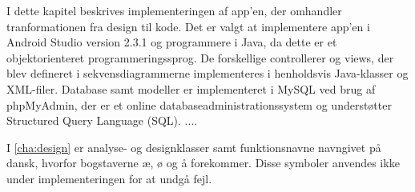 I dette kapitel beskrives implementeringen af app'en, der omhandler tranformationen fra design til kode. Det er valgt at implementere app'en i Android Studio version 2.3.1 og programmere i Java, da dette er et objektorienteret programmeringssprog. De forskellige controllerer og views, der blev defineret i sekvensdiagrammerne implementeres i henholdsvis Java-klasser og XML-filer. Database samt modeller er implementeret i MySQL ved brug af phpMyAdmin, der er et online databaseadministrationssystem og understøtter Structured Query Language (SQL). ....

I \autoref{cha:design} er analyse- og designklasser samt funktionsnavne navngivet på dansk, hvorfor bogstaverne æ, ø og å forekommer. Disse symboler anvendes ikke under implementeringen for at undgå fejl.